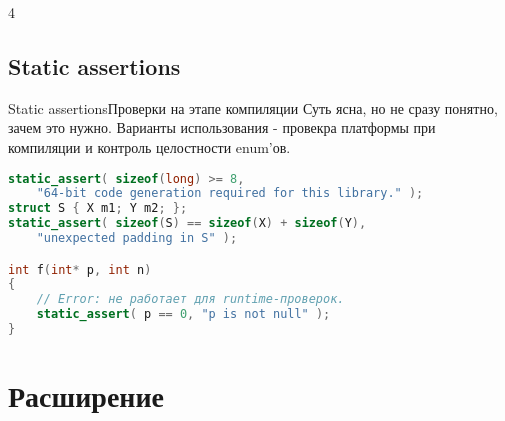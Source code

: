 4\documentclass[10pt]{beamer}
\begin{document}
\subsection{Static assertions}
\hypertarget{Static assertions}{}
\begin{frame}[fragile]{Static assertions}{Проверки на этапе компиляции}
Суть ясна, но не сразу понятно, зачем это нужно. Варианты использования - провекра платформы при компиляции и контроль целостности enum'ов.
\begin{lstlisting}[language=C++]
static_assert( sizeof(long) >= 8, 
    "64-bit code generation required for this library." );
struct S { X m1; Y m2; };
static_assert( sizeof(S) == sizeof(X) + sizeof(Y), 
    "unexpected padding in S" );

int f(int* p, int n)
{
    // Error: не работает для runtime-проверок.
    static_assert( p == 0, "p is not null" ); 
}

\end{lstlisting}
\end{frame}

\section{Расширение}
\end{document}

